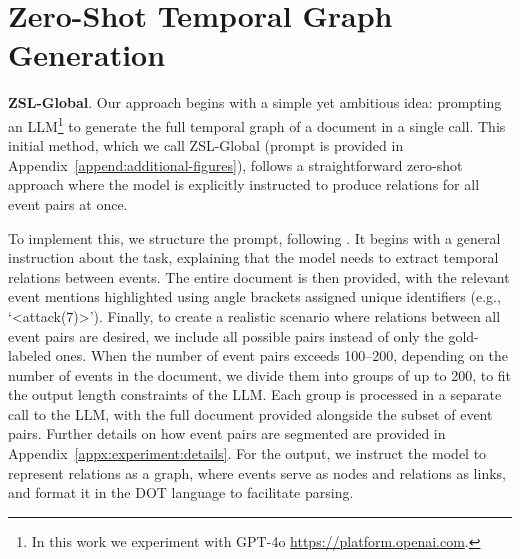 \section{Zero-Shot Temporal Graph Generation}
\label{section:model}

\textbf{ZSL-Global}. Our approach begins with a simple yet ambitious idea: prompting an LLM\footnote{In this work we experiment with GPT-4o \url{https://platform.openai.com}.} to generate the full temporal graph of a document in a single call. This initial method, which we call ZSL-Global (prompt is provided in Appendix~\ref{append:additional-figures}), follows a straightforward zero-shot approach where the model is explicitly instructed to produce relations for all event pairs at once.

To implement this, we structure the prompt, following \citet{yuan-etal-2023-zero}. It begins with a general instruction about the task, explaining that the model needs to extract temporal relations between events. The entire document is then provided, with the relevant event mentions highlighted using angle brackets assigned unique identifiers (e.g., `<attack(7)>’). Finally, to create a realistic scenario where relations between all event pairs are desired, we include all possible pairs instead of only the gold-labeled ones. When the number of event pairs exceeds 100–200, depending on the number of events in the document, we divide them into groups of up to 200, to fit the output length constraints of the LLM. Each group is processed in a separate call to the LLM, with the full document provided alongside the subset of event pairs. Further details on how event pairs are segmented are provided in Appendix~\ref{appx:experiment:details}.
For the output, we instruct the model to represent relations as a graph, where events serve as nodes and relations as links, and format it in the DOT language \cite{Gansner2006DrawingGW} to facilitate parsing.


